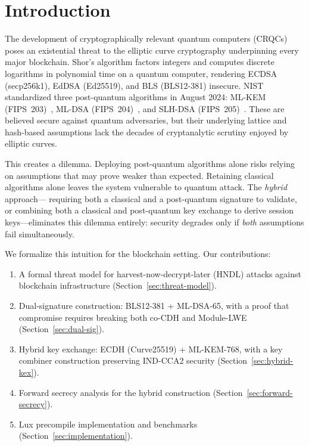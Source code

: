 \section{Introduction}

\label{sec:introduction}

The development of cryptographically relevant quantum computers (CRQCs) poses an
existential threat to the elliptic curve cryptography underpinning every major
blockchain. Shor's algorithm factors integers and computes discrete logarithms in
polynomial time on a quantum computer, rendering ECDSA (secp256k1), EdDSA (Ed25519),
and BLS (BLS12-381) insecure. NIST standardized three post-quantum algorithms in
August 2024: ML-KEM (FIPS~203)~\cite{fips203}, ML-DSA (FIPS~204)~\cite{fips204},
and SLH-DSA (FIPS~205)~\cite{fips205}. These are believed secure against quantum
adversaries, but their underlying lattice and hash-based assumptions lack the
decades of cryptanalytic scrutiny enjoyed by elliptic curves.

This creates a dilemma. Deploying post-quantum algorithms alone risks relying on
assumptions that may prove weaker than expected. Retaining classical algorithms
alone leaves the system vulnerable to quantum attack. The \emph{hybrid} approach---
requiring both a classical and a post-quantum signature to validate, or combining
both a classical and post-quantum key exchange to derive session keys---eliminates
this dilemma entirely: security degrades only if \emph{both} assumptions fail
simultaneously.

We formalize this intuition for the blockchain setting. Our contributions:

\begin{enumerate}[leftmargin=2em]
  \item A formal threat model for harvest-now-decrypt-later (HNDL) attacks against
        blockchain infrastructure (Section~\ref{sec:threat-model}).
  \item Dual-signature construction: BLS12-381 + ML-DSA-65, with a proof that
        compromise requires breaking both co-CDH and Module-LWE
        (Section~\ref{sec:dual-sig}).
  \item Hybrid key exchange: ECDH (Curve25519) + ML-KEM-768, with a key combiner
        construction preserving IND-CCA2 security
        (Section~\ref{sec:hybrid-kex}).
  \item Forward secrecy analysis for the hybrid construction
        (Section~\ref{sec:forward-secrecy}).
  \item Lux precompile implementation and benchmarks
        (Section~\ref{sec:implementation}).
\end{enumerate}


